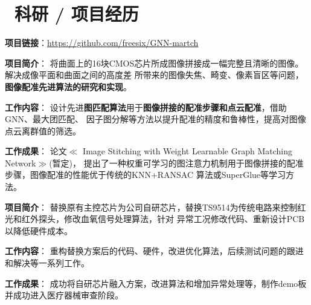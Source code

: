 \documentclass{resume}
\begin{document}
\section{\textcolor[RGB]{50,50,190}{\faUsers\ 科研 / 项目经历}}


\textcolor[RGB]{80,100,190}{\textbf{项目链接}}：\hyperlink{https://github.com/freesix/GNN-martch}
{https://github.com/freesix/GNN-martch}

\textcolor[RGB]{80,100,190}{\textbf{项目简介}}：
将曲面上的16块CMOS芯片所成图像拼接成一幅完整且清晰的图像。解决成像平面和曲面之间的高度差
所带来的图像失焦、畸变、像素盲区等问题，\textbf{图像配准先进算法的研究和实现}。

\textcolor[RGB]{80,100,190}{\textbf{工作内容}}：
设计先进\textbf{图匹配算法}用于\textbf{图像拼接的配准步骤和点云配准}，借助GNN、最大团匹配、
因子图分解等方法以提升配准的精度和鲁棒性，提高对图像点云离群值的筛选。

\textcolor[RGB]{80,100,190}{\textbf{工作成果}}：
论文$\ll$ Image Stitching with Weight Learnable Graph Matching Network$\gg$(暂定)，
提出了一种权重可学习的图注意力机制用于图像拼接的配准步骤，图像配准的性能优于传统的KNN+RANSAC
算法或SuperGlue等学习方法。

\textcolor[RGB]{80,100,190}{\textbf{项目简介}}：
替换原有主控芯片为公司自研芯片，替换TS9514为传统电路来控制红光和红外探头，修改血氧信号处理算法，针对
异常工况修改代码、重新设计PCB以降低硬件成本。

\textcolor[RGB]{80,100,190}{\textbf{工作内容}}：
重构替换方案后的代码、硬件，改进优化算法，后续测试问题的跟进和解决等一系列工作。

\textcolor[RGB]{80,100,190}{\textbf{工作成果}}：
成功将自研芯片融入方案，改进算法和增加异常处理等，制作demo板并成功进入医疗器械审查阶段。
\end{document}

